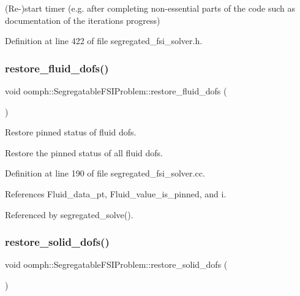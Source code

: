 (Re-\/)start timer (e.\+g. after completing non-\/essential parts of the code such as documentation of the iteration\textquotesingle{}s progress) 



Definition at line 422 of file segregated\+\_\+fsi\+\_\+solver.\+h.

\mbox{\label{classoomph_1_1SegregatableFSIProblem_abbf4987f2891218d8efcf53de6150425}} 
\subsubsection{\texorpdfstring{restore\+\_\+fluid\+\_\+dofs()}{restore\_fluid\_dofs()}}
{\footnotesize\ttfamily void oomph\+::\+Segregatable\+F\+S\+I\+Problem\+::restore\+\_\+fluid\+\_\+dofs (\begin{DoxyParamCaption}{ }\end{DoxyParamCaption})\hspace{0.3cm}{\ttfamily [protected]}}



Restore pinned status of fluid dofs. 

Restore the pinned status of all fluid dofs. 

Definition at line 190 of file segregated\+\_\+fsi\+\_\+solver.\+cc.



References Fluid\+\_\+data\+\_\+pt, Fluid\+\_\+value\+\_\+is\+\_\+pinned, and i.



Referenced by segregated\+\_\+solve().

\mbox{\label{classoomph_1_1SegregatableFSIProblem_a6da202671582bf7bf13a3dceb115385f}} 
\subsubsection{\texorpdfstring{restore\+\_\+solid\+\_\+dofs()}{restore\_solid\_dofs()}}
{\footnotesize\ttfamily void oomph\+::\+Segregatable\+F\+S\+I\+Problem\+::restore\+\_\+solid\+\_\+dofs (\begin{DoxyParamCaption}{ }\end{DoxyParamCaption})\hspace{0.3cm}{\ttfamily [protected]}}



